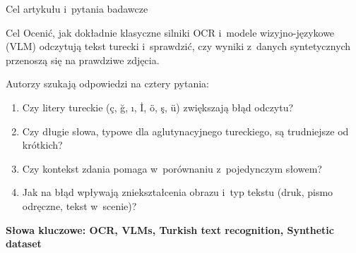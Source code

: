 \documentclass[aspectratio=169,11pt]{beamer}
\begin{document}
\begin{frame}{Cel artykułu i~pytania badawcze}
  \begin{block}{Cel}
    Ocenić, jak dokładnie klasyczne silniki OCR i~modele wizyjno-językowe (VLM) odczytują tekst turecki
    i~sprawdzić, czy wyniki z~danych syntetycznych przenoszą się na prawdziwe zdjęcia.
  \end{block}
  \small
  Autorzy szukają odpowiedzi na cztery pytania:
  \begin{enumerate}
    \item Czy litery tureckie (ç, ğ, ı, İ, ö, ş, ü) zwiększają błąd odczytu?
    \item Czy długie słowa, typowe dla aglutynacyjnego tureckiego, są trudniejsze od krótkich?
    \item Czy kontekst zdania pomaga w~porównaniu z~pojedynczym słowem?
    \item Jak na błąd wpływają zniekształcenia obrazu i~typ tekstu (druk, pismo odręczne, tekst w~scenie)?
  \end{enumerate}
  \medskip
  {\normalsize \textbf{Słowa kluczowe: OCR, VLMs, Turkish text recognition, Synthetic dataset}}
\end{frame}
\end{document}
